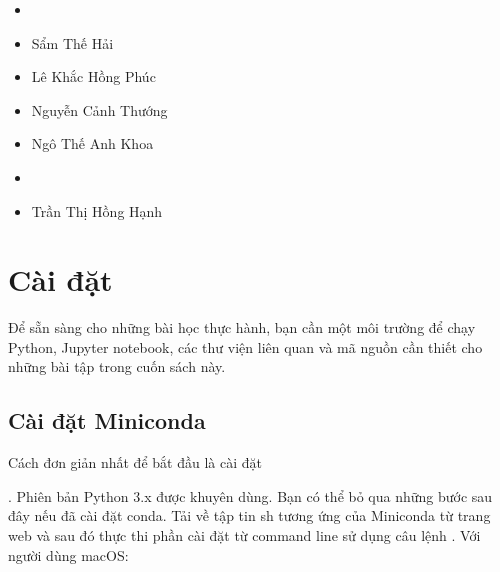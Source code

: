 \documentclass[letterpaper,11pt,english]{sphinxmanual}
\begin{document}
\begin{itemize}
\item {} 
\end{itemize}


\begin{itemize}
\item {} 
Sẩm Thế Hải

\item {} 
Lê Khắc Hồng Phúc

\item {} 
Nguyễn Cảnh Thướng

\end{itemize}


\begin{itemize}
\item {} 
Ngô Thế Anh Khoa

\end{itemize}


\begin{itemize}
\item {} 
\end{itemize}


\begin{itemize}
\item {} 
Trần Thị Hồng Hạnh

\end{itemize}






\chapter{Cài đặt}
\label{\detokenize{chapter_install/index_vn:cai-dat}}\label{\detokenize{chapter_install/index_vn:chap-installation}}\label{\detokenize{chapter_install/index_vn::doc}}


Để sẵn sàng cho những bài học thực hành, bạn cần một môi trường để chạy
Python, Jupyter notebook, các thư viện liên quan và mã nguồn cần thiết
cho những bài tập trong cuốn sách này.




\section{Cài đặt Miniconda}
\label{\detokenize{chapter_install/index_vn:cai-dat-miniconda}}


Cách đơn giản nhất để bắt đầu là cài đặt
%
\begin{footnote}[25]\sphinxAtStartFootnote
{}
%
\end{footnote}. Phiên bản
Python 3.x được khuyên dùng. Bạn có thể bỏ qua những bước sau đây nếu đã
cài đặt conda. Tải về tập tin sh tương ứng của Miniconda từ trang web và
sau đó thực thi phần cài đặt từ command line sử dụng câu lệnh
. Với người dùng macOS:
\end{document}
